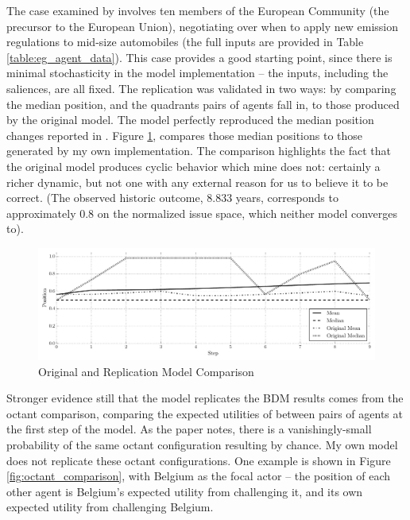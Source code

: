 The case examined by \citet{scholz_2011} involves ten members of the European Community (the precursor to the European Union), negotiating over when to apply new emission regulations to mid-size automobiles (the full inputs are provided in Table \ref{table:eg_agent_data}). This case provides a good starting point, since there is minimal stochasticity in the model implementation -- the inputs, including the saliences, are all fixed. The \citet{scholz_2011} replication was validated in two ways: by comparing the median position, and the quadrants pairs of agents fall in, to those produced by the original model. The \citet{scholz_2011} model perfectly reproduced the median position changes reported in \citet{bdm_1994}. Figure \ref{fig:model_comparison}, compares those median positions to those generated by my own implementation. The comparison highlights the fact that the original model produces cyclic behavior which mine does not: certainly a richer dynamic, but not one with any external reason for us to believe it to be correct. (The observed historic outcome, 8.833 years, corresponds to approximately 0.8 on the normalized issue space, which neither model converges to).

\begin{figure}
  \centering
  \includegraphics[scale=0.5]{BDM_Reproduction/Figures/ModelComparison}
  \caption{Original and Replication Model Comparison}
  \label{fig:model_comparison}

  \figSpace
\end{figure}

Stronger evidence still that the \citet{scholz_2011} model replicates the BDM results comes from the octant comparison, comparing the expected utilities of between pairs of agents at the first step of the model. As the paper notes, there is a vanishingly-small probability of the same octant configuration resulting by chance. My own model does not replicate these octant configurations. One example is shown in Figure \ref{fig:octant_comparison}, with Belgium as the focal actor -- the position of each other agent is Belgium's expected utility from challenging it, and its own expected utility from challenging Belgium.

